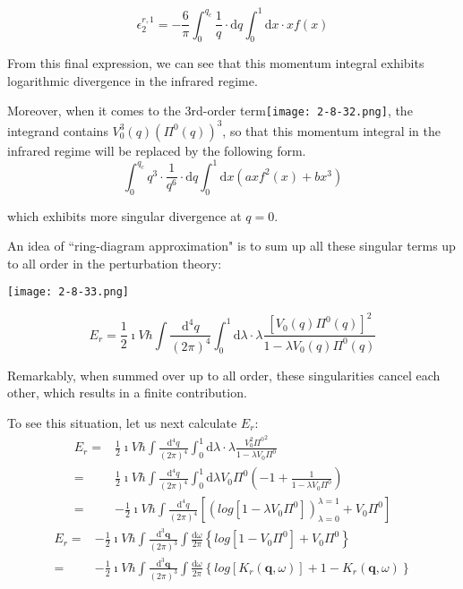 \begin{equation*} \label{Eqs2.8.9.d} \tag{2.8.9.d}
\epsilon_2^{r,1}= -\frac{6}{\pi} \int_0^{q_c} \frac{1}{q} \cdot \mathrm{d} q \int_0^{1} \mathrm{d} x \cdot  x f(x)
\end{equation*}

From this final expression, we can see that this momentum integral exhibits logarithmic divergence in the infrared regime.

Moreover, when it comes to the 3rd-order term\texttt{[image: 2-8-32.png]}, the integrand contains $V_0^3(q) (\Pi^0(q))^3$, so that this momentum integral in the infrared regime will be replaced by the following form.
\begin{equation*} \label{Eqs2.8.9.e} \tag{2.8.9.e}
\int_0^{q_c}q^3 \cdot \frac{1}{q^6} \cdot \mathrm{d}q \int_0^1 \mathrm{d} x \left( a x f^2(x) + bx^3 \right)
\end{equation*}

which exhibits more singular divergence at $q=0$.

An idea of ``ring-diagram approximation" is to sum up all these singular terms up to all order in the perturbation theory:
\begin{center} \label{Fig2.8.33}
\texttt{[image: 2-8-33.png]}
\end{center}
\begin{equation*} \tag{2.8.9}
E_r = \frac{1}{2}\imath V\hbar \int \frac{\mathrm{d}^4 q}{(2\pi)^4} \int_0^1 \mathrm{d} \lambda \cdot \lambda \frac{[ V_0(q) \Pi^0(q)]^2}{1-\lambda V_0(q) \Pi^0(q)}
\end{equation*}

Remarkably, when summed over up to all order, these singularities cancel each other, which results in a finite contribution.

To see this situation, let us next calculate $E_r$:
\[\begin{split}
E_r =& \frac{1}{2}\imath V\hbar \int \frac{\mathrm{d}^4 q}{(2\pi)^4} \int_0^1 \mathrm{d} \lambda \cdot \lambda \frac{V_0^2 {\Pi^0}^2}{1-\lambda V_0\Pi^0}\\
=& \frac{1}{2}\imath V\hbar \int \frac{\mathrm{d}^4 q}{(2\pi)^4} \int_0^1 \mathrm{d} \lambda V_0 \Pi^0\left( -1 + \frac{1}{1-\lambda V_0 \Pi^0} \right)\\
=& - \frac{1}{2}\imath V\hbar \int \frac{\mathrm{d}^4 q}{(2\pi)^4}\left[\left( log[1-\lambda V_0 \Pi^0] \right)_{\lambda=0}^{\lambda=1} + V_0 \Pi^0 \right]\end{split}\]
\begin{equation*} \label{Eqs2.8.9'} \tag{2.8.9'} \begin{split}
E_r=& - \frac{1}{2}\imath V\hbar \int \frac{\mathrm{d}^3 \mathbf{q}}{(2\pi)^3} \int \frac{\mathrm{d} \omega}{2\pi} \left\{ log[1-V_0 \Pi^0] + V_0 \Pi^0 \right\}\\
=& - \frac{1}{2}\imath V\hbar \int \frac{\mathrm{d}^3 \mathbf{q}}{(2\pi)^3} \int \frac{\mathrm{d} \omega}{2\pi} \left\{ log[K_r(\mathbf{q},\omega)] + 1-K_r(\mathbf{q},\omega) \right\}
\end{split}\end{equation*}

